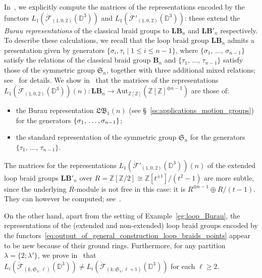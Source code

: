 \documentclass[AHL,Unicode,published]{cedram}
\newcommand{\Aut}{\mathrm{Aut}}
\newcommand{\Int}{\mathring}
\newcommand{\B}{\ensuremath{\mathbf{B}}}
\newcommand{\lB}{\mathbf{LB}}
\newcommand{\Sym}{\mathfrak{S}}
\newcommand{\LB}{\mathfrak{LB}}
\newcommand{\cF}{\mathcal{F}}
\newcommand{\bD}{\mathbb{D}}
\newcommand{\bZ}{\mathbb{Z}}
\renewcommand{\geq}{\geqslant}
\renewcommand{\leq}{\leqslant}
\begin{document}
\begin{exam}\label{eg:loop_Burau}
In~\cite{PS0}, we explicitly compute the matrices of the representations encoded by the functors $L_{1}(\Int{\cF}_{(\underline{1},0,2)}(\bD^{3}))$ and $L_{1}(\Int{\cF}'_{(\underline{1},0,2)}(\bD^{3}))$: these extend the \emph{Burau representations} of the classical braid groups to $\lB_{n}$ and $\lB'_{n}$ respectively. To describe these calculations, we recall that the loop braid group $\lB_{n}$ admits a presentation given by generators $\{ \sigma_{i},\tau_{i}\mid 1\leq i\leq n-1\}$, where $\{\sigma_{1},\,\ldots,\,\sigma_{n-1}\}$ satisfy the relations of the classical braid group $\B_{n}$ and $\{\tau_{1},\,\ldots,\,\tau_{n-1}\}$ satisfy those of the symmetric group $\Sym_{n}$, together with three additional mixed relations; see~\cite[Prop.~3.14 and~3.16]{Damianijourney} for details. We show in~\cite{PS0} that the matrices of the representations $L_{1}(\Int{\cF}_{(\underline{1},0,2)}(\bD^{3}))(n)\colon\lB_{n}\rightarrow\Aut_{\bZ[\bZ]}(\bZ[\bZ]^{\oplus n-1})$ are those of:
\begin{itemize}
\item the Burau representation $\LB_{1}(n)$ (see \S~\ref{ss:applications_motion_groups}) for the generators $\{\sigma_{1},\,\ldots,\linebreak\sigma_{n-1}\}$;
\item the standard representation of the symmetric group $\Sym_{n}$ for the generators $\{\tau_{1},\,\ldots,\,\tau_{n-1}\}$.
\end{itemize}
The matrices for the representations $L_{1}(\Int{\cF}'_{(\underline{1},0,2)}(\bD^{3}))(n)$ of the extended loop braid groups $\lB'_{n}$ over $R = \bZ[\bZ/2] \cong \bZ[t^{\pm 1}] / (t^2 - 1)$ are more subtle, since the underlying $R$-module is not free in this case: it is $R^{\oplus n-1} \oplus R/(t-1)$. They can however be computed; see~\cite[Table~1]{PS0}.
\end{exam}

On the other hand, apart from the setting of Example~\ref{eg:loop_Burau}, the representations of the (extended and non-extended) loop braid groups encoded by the functors~\eqref{eq:output_of_general_construction_loop_braids_points} appear to be new because of their ground rings. Furthermore, for any partition $\lambda = \boldsymbol{\{}2;\lambda'\boldsymbol{\}}$, we prove in~\cite[Prop.~6.2]{PSIN} that $L_{i}(\Int{\cF}_{(\underline{k},\Sym_{\lambda},\ell)}(\bD^{3}))\neq L_{i}(\Int{\cF}_{(\underline{k},\Sym_{\lambda},\ell + 1)}(\bD^{3}))$ for each $\ell \geq 2$.
\end{document}
